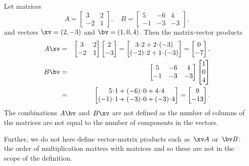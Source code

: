 \begin{example} \label{eg:matvecmul}
Let matrices
\begin{equation*}
A=\begin{bmatrix} 3 & 2\\ -2 & 1 \end{bmatrix},\quad
B=\begin{bmatrix} 5 & -6 & 4\\ -1 & -3 & -3 \end{bmatrix},
\end{equation*}
and vectors \(\xv=(2,-3)\) and \(\bv=(1,0,4)\).
Then the matrix-vector products
\begin{eqnarray*}
A\xv&=&\begin{bmatrix} 3 & 2\\ -2 & 1 \end{bmatrix}
\begin{bmatrix} 2\\-3 \end{bmatrix}
=\begin{bmatrix} 3\cdot2+2\cdot(-3)\\ (-2)\cdot2+1\cdot(-3) \end{bmatrix}
=\begin{bmatrix} 0\\ -7 \end{bmatrix},
\\
B\bv&=&\begin{bmatrix} 5 & -6 & 4\\ -1 & -3 & -3 \end{bmatrix}
\begin{bmatrix} 1\\0\\4 \end{bmatrix}
\\&=&\begin{bmatrix} 5\cdot1+(-6)\cdot0 + 4\cdot4\\ (-1)\cdot1 + (-3)\cdot0 + (-3)\cdot4 \end{bmatrix}
=\begin{bmatrix} 9\\-13 \end{bmatrix}.
\end{eqnarray*}
The combinations \(A\bv\) and~\(B\xv\) are not defined as the number of columns of the matrices are not equal to the number of components in the vectors.

Further, we do not here define vector-matrix products such as~\(\xv A\) or~\(\bv B\): the order of multiplication matters with matrices and so these are not in the scope of the definition.
\end{example}



